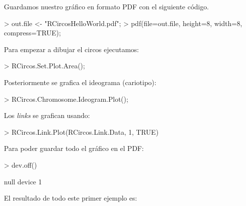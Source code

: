 \documentclass[a4paper,spanish]{article}
\begin{document}
Guardamos nuestro gráfico en formato PDF con el siguiente código.

\begin{Schunk}
\begin{Sinput}
> out.file <- "RCircosHelloWorld.pdf";
> pdf(file=out.file, height=8, width=8, compress=TRUE);
\end{Sinput}
\end{Schunk}

Para empezar a dibujar el circos ejecutamos:

\begin{Schunk}
\begin{Sinput}
> RCircos.Set.Plot.Area();
\end{Sinput}
\end{Schunk}

Posteriormente se grafica el ideograma (cariotipo):

\begin{Schunk}
\begin{Sinput}
> RCircos.Chromosome.Ideogram.Plot();
\end{Sinput}
\end{Schunk}

Los \textit{links} se grafican usando:

\begin{Schunk}
\begin{Sinput}
> RCircos.Link.Plot(RCircos.Link.Data, 1, TRUE)
\end{Sinput}
\end{Schunk}

Para poder guardar todo el gráfico en el PDF:

\begin{Schunk}
\begin{Sinput}
> dev.off()
\end{Sinput}
\begin{Soutput}
null device 
          1 
\end{Soutput}
\end{Schunk}

El resultado de todo este primer ejemplo es:
\end{document}
